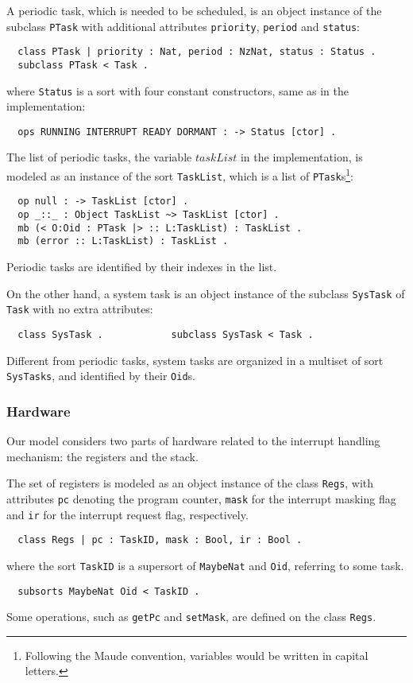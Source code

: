 \documentclass{llncs}
\begin{document}
A periodic task, which is needed to be scheduled, is an object
instance of the subclass \verb|PTask| with additional attributes
\verb|priority|, \verb|period| and \verb|status|:
\begin{verbatim}
  class PTask | priority : Nat, period : NzNat, status : Status .
  subclass PTask < Task .
\end{verbatim}
where \verb|Status| is a sort with four constant constructors, same as
in the implementation:
\begin{verbatim}
  ops RUNNING INTERRUPT READY DORMANT : -> Status [ctor] .
\end{verbatim}
The list of periodic tasks, the variable $taskList$ in the
implementation, is modeled as an instance of the sort \verb|TaskList|,
which is a list of \verb|PTask|s\footnote{Following the Maude
  convention, variables would be written in capital letters.}:
\begin{verbatim}
  op null : -> TaskList [ctor] .
  op _::_ : Object TaskList ~> TaskList [ctor] .
  mb (< O:Oid : PTask |> :: L:TaskList) : TaskList .
  mb (error :: L:TaskList) : TaskList .
\end{verbatim}
Periodic tasks are identified by their indexes in the list.

On the other hand, a system task is an object instance of the subclass
\verb|SysTask| of \verb|Task| with no extra attributes:
\begin{verbatim}
  class SysTask .            subclass SysTask < Task .
\end{verbatim}
Different from periodic tasks, system tasks are organized in a
multiset of sort \verb|SysTasks|, and identified by their \verb|Oid|s.

\subsubsection{Hardware}
Our model considers two parts of hardware related to the interrupt
handling mechanism: the registers and the stack.

The set of registers is modeled as an object instance of the class
\verb|Regs|, with attributes \verb|pc| denoting the program counter,
\verb|mask| for the interrupt masking flag and \verb|ir| for the
interrupt request flag, respectively.
\begin{verbatim}
  class Regs | pc : TaskID, mask : Bool, ir : Bool .
\end{verbatim}
where the sort \verb|TaskID| is a supersort of \verb|MaybeNat| and
\verb|Oid|, referring to some task.
\begin{verbatim}
  subsorts MaybeNat Oid < TaskID .
\end{verbatim}
Some operations, such as \verb|getPc| and \verb|setMask|, are defined
on the class \verb|Regs|.
\end{document}
